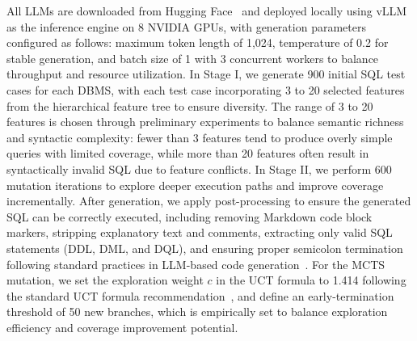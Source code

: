 All LLMs are downloaded from Hugging Face~\cite{Huggingface} and deployed locally using vLLM~\cite{kwon2023efficient} as the inference engine on 8 NVIDIA GPUs, with generation parameters configured as follows: maximum token length of 1,024, temperature of 0.2 for stable generation, and batch size of 1 with 3 concurrent workers to balance throughput and resource utilization. In Stage I, we generate 900 initial SQL test cases for each DBMS, with each test case incorporating 3 to 20 selected features from the hierarchical feature tree to ensure diversity. The range of 3 to 20 features is chosen through preliminary experiments to balance semantic richness and syntactic complexity: fewer than 3 features tend to produce overly simple queries with limited coverage, while more than 20 features often result in syntactically invalid SQL due to feature conflicts. In Stage II, we perform 600 mutation iterations to explore deeper execution paths and improve coverage incrementally. After generation, we apply post-processing to ensure the generated SQL can be correctly executed, including removing Markdown code block markers, stripping explanatory text and comments, extracting only valid SQL statements (DDL, DML, and DQL), and ensuring proper semicolon termination following standard practices in LLM-based code generation~\cite{joel2024survey,wang2023review,liu2024exploring}. For the MCTS mutation, we set the exploration weight $c$ in the UCT formula to 1.414 following the standard UCT formula recommendation~\cite{kocsis2006bandit}, and define an early-termination threshold of 50 new branches, which is empirically set to balance exploration efficiency and coverage improvement potential.

